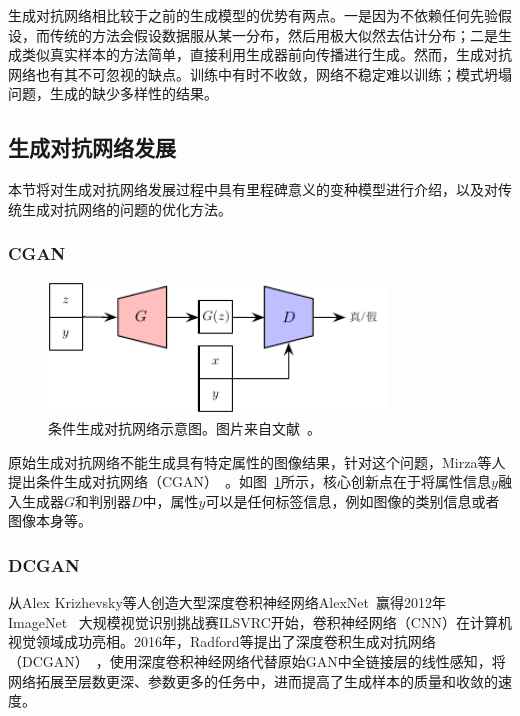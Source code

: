 生成对抗网络相比较于之前的生成模型的优势有两点。一是因为不依赖任何先验假设，而传统的方法会假设数据服从某一分布，然后用极大似然去估计分布；二是生成类似真实样本的方法简单，直接利用生成器前向传播进行生成。然而，生成对抗网络也有其不可忽视的缺点。训练中有时不收敛，网络不稳定难以训练；模式坍塌问题，生成的缺少多样性的结果。

\subsection{生成对抗网络发展}
本节将对生成对抗网络发展过程中具有里程碑意义的变种模型进行介绍，以及对传统生成对抗网络的问题的优化方法。

\subsubsection{CGAN}

\begin{figure}[ht]
    \centering
	\includegraphics[width=0.8\textwidth]{figures/CGAN.pdf}
	\caption{条件生成对抗网络示意图。图片来自文献~\cite{mirza2014conditional}。}
	\label{fig:pic_CGAN}
\end{figure}

原始生成对抗网络不能生成具有特定属性的图像结果，针对这个问题，Mirza等人提出条件生成对抗网络（CGAN）~\citep{mirza2014conditional}。如图~\ref{fig:pic_CGAN}所示，核心创新点在于将属性信息$y$融入生成器$G$和判别器$D$中，属性$y$可以是任何标签信息，例如图像的类别信息或者图像本身等。



\subsubsection{DCGAN}
从Alex Krizhevsky等人创造大型深度卷积神经网络AlexNet~\cite{krizhevsky2017imagenet}赢得2012年ImageNet~\cite{deng2009imagenet} 大规模视觉识别挑战赛ILSVRC开始，卷积神经网络（CNN）在计算机视觉领域成功亮相。2016年，Radford等提出了深度卷积生成对抗网络（DCGAN）~\cite{radford2015unsupervised}，使用深度卷积神经网络代替原始GAN中全链接层的线性感知，将网络拓展至层数更深、参数更多的任务中，进而提高了生成样本的质量和收敛的速度。

